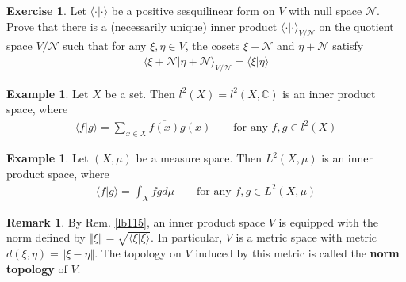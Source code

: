 \documentclass[12pt,b5paper,notitlepage]{article}
\theoremstyle{definition}
\newtheorem{eg}[df]{Example}
\newtheorem{exe}[df]{Exercise}
\newtheorem{rem}[df]{Remark}
\theoremstyle{plain}
\newcommand{\ovl}{\overline}
\newcommand{\bk}[1]{\langle {#1}\rangle}
\newcommand{\scr}{\mathscr}
\newcommand{\Cbb}{\mathbb C}
\numberwithin{equation}{section}
\begin{document}
\begin{exe}\label{lb346}
Let $\bk{\cdot|\cdot}$ be a positive sesquilinear form on $V$ with null space $\scr N$. Prove that there is a (necessarily unique) inner product $\bk{\cdot|\cdot}_{V/\scr N}$ on the quotient space $V/\scr N$ such that for any $\xi,\eta\in V$, the cosets $\xi+\scr N$ and $\eta+\scr N$ satisfy
\begin{align*}
\bk{\xi+\scr N|\eta+\scr N }_{V/\scr N}=\bk{\xi|\eta}
\end{align*}
\end{exe}


\begin{eg}
Let $X$ be a set. Then $l^2(X)=l^2(X,\Cbb)$ is an inner product space, where
\begin{align*}
\bk{f|g}=\sum_{x\in X} \ovl{f(x)}g(x)\qquad\text{for any }f,g\in l^2(X)
\end{align*} 
\end{eg}


\begin{eg}
Let $(X,\mu)$ be a measure space. Then $L^2(X,\mu)$ is an inner product space, where
\begin{align*}
\bk{f|g}=\int_X \ovl fgd\mu\qquad\text{for any }f,g\in L^2(X,\mu)
\end{align*}
\end{eg}


\begin{rem}
By Rem. \ref{lb115}, an inner product space $V$ is equipped with the norm defined by $\Vert \xi\Vert=\sqrt{\bk{\xi|\xi}}$. In particular, $V$ is a metric space with metric $d(\xi,\eta)=\Vert \xi-\eta\Vert$. The topology on $V$ induced by this metric is called the \textbf{norm topology}  of $V$. 
\end{rem}
\end{document}
